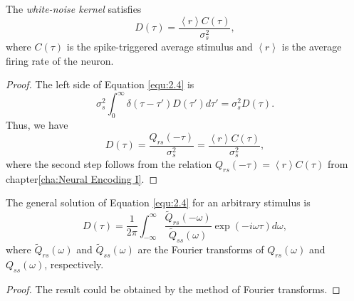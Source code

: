 \begin{prop}
  \label{prop:WhiteOptimalKernel}
  The \emph{white-noise kernel} satisfies
  \begin{equation}
    \label{equ:2.6}
    D(\tau) = \frac{\left<r\right>C(\tau)}{\sigma_s^2},
  \end{equation}
  where $C(\tau)$ is the spike-triggered average stimulus and $\left<r\right>$ is the average firing rate of the neuron.
\end{prop}
\begin{proof}
  The left side of Equation \ref{equ:2.4} is
  \begin{equation}
    \label{equ:2.5}
    \sigma_s^2\int_0^{\infty}\delta(\tau-\tau')D(\tau')d\tau' = \sigma_s^2D(\tau).
  \end{equation}
  Thus, we have
  \begin{equation}
    \label{equ:2.6}
    D(\tau) = \frac{Q_{rs}(-\tau)}{\sigma_s^2} = \frac{\left<r\right>C(\tau)}{\sigma_s^2},
  \end{equation}
  where the second step follows from the relation $Q_{rs}(-\tau) = \left<r\right>C(\tau)$ from chapter\ref{cha:Neural Encoding I}.
\end{proof}

\begin{prop}
  \label{prop:generalOptimalKernel}
  The general solution of Equation \ref{equ:2.4} for an arbitrary stimulus is
  \begin{equation}
    \label{equ:2.59}
    D(\tau) = \frac{1}{2\pi}\int_{-\infty}^{\infty}\frac{\tilde{Q}_{rs}(-\omega)}{\tilde{Q}_{ss}(\omega)}\exp\left(-i\omega\tau\right)d\omega,
  \end{equation}
  where $\tilde{Q}_{rs}(\omega)$ and $\tilde{Q}_{ss}(\omega)$ are the Fourier transforms of $Q_{rs}(\omega)$ and $Q_{ss}(\omega)$, respectively.
\end{prop}

\begin{proof}
  The result could be obtained by the method of Fourier transforms.
\end{proof}

